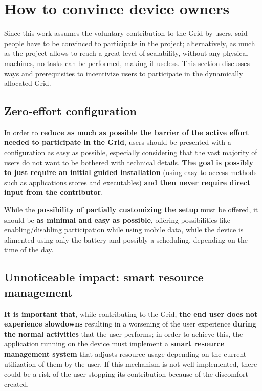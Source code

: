 \section{How to convince device owners}
Since this work assumes the voluntary contribution to the Grid by users, said people have to be convinced to participate in the project; alternatively, as much as the project allows to reach a great level of scalability, without any physical machines, no tasks can be performed, making it useless. This section discusses ways and prerequisites to incentivize users to participate in the dynamically allocated Grid.

\subsection{Zero-effort configuration}
In order to \textbf{reduce as much as possible the barrier of the active effort needed to participate in the Grid}, users should be presented with a configuration as easy as possible, especially considering that the vast majority of users do not want to be bothered with technical details. \textbf{The goal is possibly to just require an initial guided installation} (using easy to access methods such as applications stores and executables) \textbf{and then never require direct input from the contributor}.

While the \textbf{possibility of partially customizing the setup} must be offered, it should be \textbf{as minimal and easy as possible}, offering possibilities like enabling/disabling participation while using mobile data, while the device is alimented using only the battery and possibly a scheduling, depending on the time of the day. 

\subsection{Unnoticeable impact: smart resource management}
\textbf{It is important that}, while contributing to the Grid, \textbf{the end user does not experience slowdowns} resulting in a worsening of the user experience \textbf{during the normal activities} that the user performs; in order to achieve this, the application running on the device must implement a \textbf{smart resource management system} that adjusts resource usage depending on the current utilization of them by the user. If this mechanism is not well implemented, there could be a risk of the user stopping its contribution because of the discomfort created.

